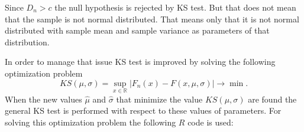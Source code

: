 \documentclass[a4paper, 12pt, titlepage, headsepline, listof = totoc, bibliography = totoc, numbers = noenddot]{scrartcl}
\begin{document}
\begin{Schunk}
\end{Schunk}
Since $D_n>c$ the null hypothesis is rejected by KS test. But that does not mean
that the sample is not normal distributed. That means only that it is not normal
distributed with sample mean and sample variance as parameters of that
distribution. 

In order to manage that issue KS test is improved by solving the following
optimization problem \[KS(\mu,\sigma)=\sup_{x \in
\mathbb{R}}|F_n(x)-F(x,\mu,\sigma)|\to \min.\]
When the new values $\hat{\mu}$ and $\hat{\sigma}$ that minimize the value
$KS(\mu,\sigma)$ are found the general KS test is performed with respect to
these values of parameters. For solving this optimization problem the following
$R$ code is used:
\end{document}
